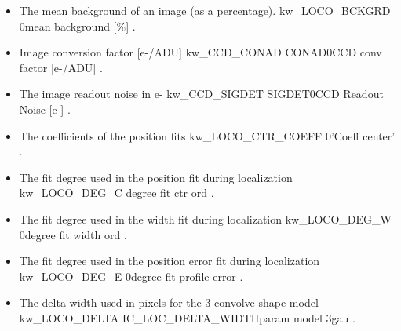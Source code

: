 \begin{itemize}

\item {}
{The mean background of an image (as a percentage).}
{kw\_LOCO\_BCKGRD}
{}{0}{mean background [\%]}
{\callocRAW}{\spirouKeywords}{\callocRAW.\progMAIN}


\item {}
{Image conversion factor [e-/ADU]}
{kw\_CCD\_CONAD}
{CONAD}{0}{CCD conv factor [e-/ADU]}
{\callocRAW}{\spirouKeywords}{\callocRAW.\progMAIN}


\item {}
{The image readout noise in e-}
{kw\_CCD\_SIGDET}
{SIGDET}{0}{CCD Readout Noise [e-]}
{\callocRAW}{\spirouKeywords}{\callocRAW.\progMAIN}


\item {}
{The coefficients of the position fits}
{kw\_LOCO\_CTR\_COEFF}
{}{0}{'Coeff center'}
{\callocRAW}{\spirouKeywords}{\callocRAW.\progMAIN}


\item {}
{The fit degree used in the position fit during localization}
{kw\_LOCO\_DEG\_C}
{}{}{degree fit ctr ord}
{\callocRAW}{\spirouKeywords}{\callocRAW.\progMAIN}


\item {}
{The fit degree used in the width fit during localization}
{kw\_LOCO\_DEG\_W}
{}{0}{degree fit width ord}
{\callocRAW}{\spirouKeywords}{\callocRAW.\progMAIN}


\item {}
{The fit degree used in the position error fit during localization}
{kw\_LOCO\_DEG\_E}
{}{0}{degree fit profile error}
{\callocRAW}{\spirouKeywords}{\callocRAW.\progMAIN}


\item {}
{The delta width used in pixels for the 3 convolve shape model}
{kw\_LOCO\_DELTA}
{}{IC\_LOC\_DELTA\_WIDTH}{param model 3gau}
{\callocRAW}{\spirouKeywords}{\callocRAW.\progMAIN}



\end{itemize}
